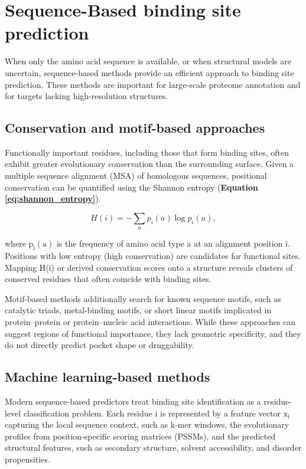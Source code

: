 \documentclass[12pt]{article}
\begin{document}
\section{Sequence-Based binding site prediction}

When only the amino acid sequence is available, or when structural models are uncertain, sequence-based methods provide an efficient approach to binding site prediction. These methods are important for large-scale proteome annotation and for targets lacking high-resolution structures.

\subsection{Conservation and motif-based approaches}

Functionally important residues, including those that form binding sites, often exhibit greater evolutionary conservation than the surrounding surface. Given a multiple sequence alignment (MSA) of homologous sequences, positional conservation can be quantified using the Shannon entropy (\textbf{Equation \ref{eq:shannon_entropy}}).

\begin{equation}
H(i) = - \sum_{a} p_i(a) \log p_i(a),
\label{eq:shannon_entropy}
\end{equation}

where $\textrm{p}_\textrm{i}(\textrm{a})$ is the frequency of amino acid type a at an alignment position i. Positions with low entropy (high conservation) are candidates for functional sites. Mapping H(i) or derived conservation scores onto a structure reveals clusters of conserved residues that often coincide with binding sites.\cite{CH5_ghersi2011beyond}

Motif-based methods additionally search for known sequence motifs, such as catalytic triads, metal-binding motifs, or short linear motifs implicated in protein--protein or protein--nucleic acid interactions.\cite{CH5_ghersi2011beyond} While these approaches can suggest regions of functional importance, they lack geometric specificity, and they do not directly predict pocket shape or druggability.

\subsection{Machine learning-based methods}

Modern sequence-based predictors treat binding site identification as a residue-level classification problem. Each residue i is represented by a feature vector $\textrm{x}_\textrm{i}$ capturing the local sequence context, such as k-mer windows, the evolutionary profiles from position-specific scoring matrices (PSSMs), and the predicted structural features, such as secondary structure, solvent accessibility, and disorder propensities.
\end{document}
